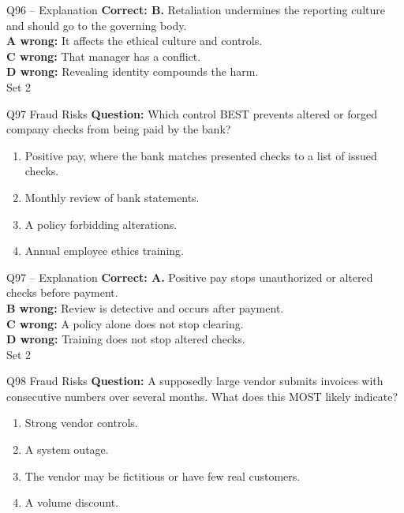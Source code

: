\documentclass[aspectratio=169,10pt]{beamer}
\begin{document}
\begin{frame}[t]{Q96 -- Explanation}
	\footnotesize
	\textbf{Correct: B.} Retaliation undermines the reporting culture and should go to the governing body. \\[5pt]
\textbf{A wrong:} It affects the ethical culture and controls. \\[3pt]
\textbf{C wrong:} That manager has a conflict. \\[3pt]
\textbf{D wrong:} Revealing identity compounds the harm. \\[3pt]
	\vfill {\tiny Set 2}
\end{frame}

\begin{frame}[t]{Q97 \hfill {\scriptsize Fraud Risks}}
	\small
	\textbf{Question:} Which control BEST prevents altered or forged company checks from being paid by the bank?
	\begin{enumerate}[label=\Alph*.,itemsep=1pt,topsep=3pt]
			\item Positive pay, where the bank matches presented checks to a list of issued checks.
			\item Monthly review of bank statements.
			\item A policy forbidding alterations.
			\item Annual employee ethics training.
	\end{enumerate}
\end{frame}

\begin{frame}[t]{Q97 -- Explanation}
	\footnotesize
	\textbf{Correct: A.} Positive pay stops unauthorized or altered checks before payment. \\[5pt]
\textbf{B wrong:} Review is detective and occurs after payment. \\[3pt]
\textbf{C wrong:} A policy alone does not stop clearing. \\[3pt]
\textbf{D wrong:} Training does not stop altered checks. \\[3pt]
	\vfill {\tiny Set 2}
\end{frame}

\begin{frame}[t]{Q98 \hfill {\scriptsize Fraud Risks}}
	\small
	\textbf{Question:} A supposedly large vendor submits invoices with consecutive numbers over several months. What does this MOST likely indicate?
	\begin{enumerate}[label=\Alph*.,itemsep=1pt,topsep=3pt]
			\item Strong vendor controls.
			\item A system outage.
			\item The vendor may be fictitious or have few real customers.
			\item A volume discount.
	\end{enumerate}
\end{frame}
\end{document}
